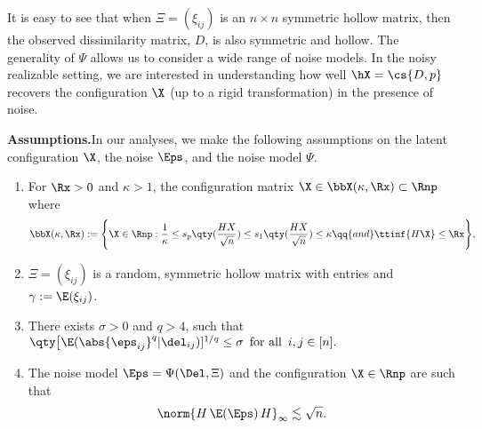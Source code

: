 \documentclass[10pt]{article}
\begin{document}
It is easy to see that when $\Xi = (\xi_{ij})$ is an $n \times n$ symmetric hollow matrix, then the observed dissimilarity matrix, $D$, is also symmetric and hollow. The generality of $\Psi$ allows us to consider a wide range of noise models. In the noisy realizable setting, we are interested in understanding how well $\hX = \cs{D, p}$ recovers the configuration $\X$ {(up to a rigid transformation)} in the presence of noise. 

\textbf{Assumptions.}\quad In our analyses, we make the following assumptions on the latent configuration $\X$, the noise $\Eps$, and the noise model $\Psi$. 

\begin{enumerate}[label=(\textbf{A}$_{\arabic*}$), ref=\textup{(\textbf{A}$_{\arabic*}$)}]
    \item\label{assumption:compact} For $\Rx > 0$ and $\kappa > 1$, the configuration matrix $\X \in \bbX(\kappa, \Rx) \subset \Rnp$ where
    \begin{align}
    \bbX(\kappa, \Rx) := \Bigg\{\X \in \Rnp:
        \frac{1}{\kappa} \le s_p\qty(\frac{HX}{\sqrt{n}}) \le s_1\qty(\frac{HX}{\sqrt{n}}) \le \kappa \qq{and} \ttinf{H\X} \le \Rx\Bigg\},\label{eq:bbX}
    \end{align}
    \item\label{assumption:independence} $\Xi = (\xi_{ij})$ is a random, symmetric hollow matrix with \iid{} entries and $\gamma := \E(\xi_{ij})$.
    \item\label{assumption:moments} There exists $\sigma > 0$ and $q > 4$, such that 
    $
    \qty\big[\E(\abs{\eps_{ij}}^q | \del_{ij})]^{1/q} \le \sigma \,\text{ for all }\, i, j \in [n].
    $
    \item\label{assumption:expectation} The noise model $\Eps = \Psi(\Del, \Xi)$ and the configuration $\X \in \Rnp$ are such that 
    $$
    \norm{H\,\E(\Eps)\,H}_{\infty} \lesssim \sqrt{n}.
    $$
\end{enumerate}
\end{document}
